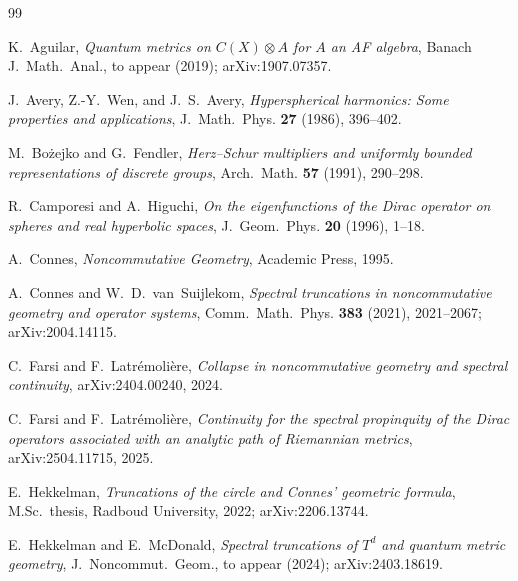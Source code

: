 \documentclass[11pt,a4paper]{article}
\theoremstyle{plain}
\theoremstyle{definition}
\begin{document}

\begin{thebibliography}{99}

K.~Aguilar,
\newblock \emph{Quantum metrics on $C(X) \otimes A$ for $A$ an AF
algebra},
\newblock Banach J.~Math.~Anal., to appear (2019);
\newblock arXiv:1907.07357.

J.~Avery, Z.-Y.~Wen, and J.~S.~Avery,
\newblock \emph{Hyperspherical harmonics: Some properties and applications},
\newblock J.~Math.~Phys. \textbf{27} (1986), 396--402.

M.~Bo{\.z}ejko and G.~Fendler,
\newblock \emph{Herz--Schur multipliers and uniformly bounded
representations of discrete groups},
\newblock Arch.~Math. \textbf{57} (1991), 290--298.

R.~Camporesi and A.~Higuchi,
\newblock \emph{On the eigenfunctions of the Dirac operator on
spheres and real hyperbolic spaces},
\newblock J.~Geom.~Phys. \textbf{20} (1996), 1--18.

A.~Connes,
\newblock \emph{Noncommutative Geometry},
\newblock Academic Press, 1995.

A.~Connes and W.~D.~van~Suijlekom,
\newblock \emph{Spectral truncations in noncommutative geometry and
operator systems},
\newblock Comm.~Math.~Phys. \textbf{383} (2021), 2021--2067;
\newblock arXiv:2004.14115.

C.~Farsi and F.~Latr\'emoli\`ere,
\newblock \emph{Collapse in noncommutative geometry and spectral
continuity},
\newblock arXiv:2404.00240, 2024.

C.~Farsi and F.~Latr\'emoli\`ere,
\newblock \emph{Continuity for the spectral propinquity of the Dirac
operators associated with an analytic path of Riemannian metrics},
\newblock arXiv:2504.11715, 2025.

E.~Hekkelman,
\newblock \emph{Truncations of the circle and Connes' geometric
formula},
\newblock M.Sc.\ thesis, Radboud University, 2022;
\newblock arXiv:2206.13744.

E.~Hekkelman and E.~McDonald,
\newblock \emph{Spectral truncations of $T^d$ and quantum metric
geometry},
\newblock J.~Noncommut.~Geom., to appear (2024);
\newblock arXiv:2403.18619.


\end{thebibliography}
\end{document}

